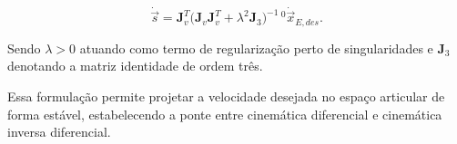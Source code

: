 \begin{equation}
\label{eq_pseudoinversa_preIK}
\dot{\vec{s}}
=
\mathbf{J}_{v}^{T}
\bigl(
\mathbf{J}_{v}\mathbf{J}_{v}^{T}
+
\lambda^{2}\mathbf{J}_{3}
\bigr)^{-1}
\,{}^{0}\!\dot{\vec{x}}_{E,des}.
\end{equation}

Sendo $\lambda > 0$ atuando como termo de regularização perto de singularidades e $\mathbf{J}_{3}$ denotando a matriz identidade de ordem três.


Essa formulação permite projetar a velocidade desejada no espaço articular de forma estável, estabelecendo a ponte entre cinemática diferencial e cinemática inversa diferencial.
